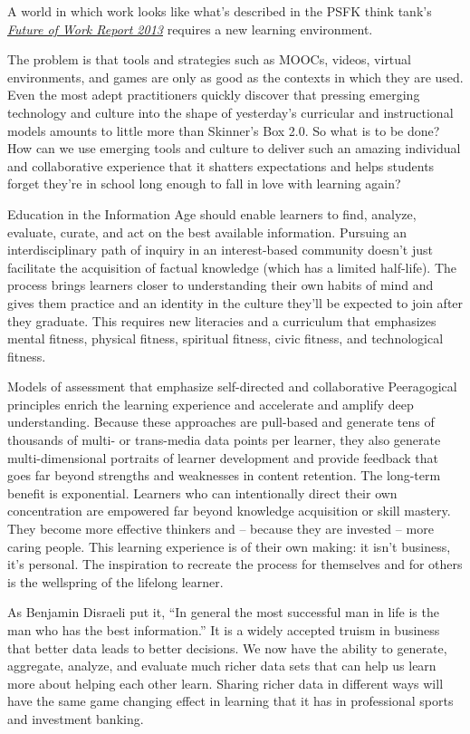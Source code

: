 A world in which work looks like what's described in the PSFK think
tank's
\emph{\href{http://www.slideshare.net/PSFK/psfk-presents-future-of-work-report}{Future
of Work Report 2013}} requires a new learning environment.

The problem is that tools and strategies such as MOOCs, videos, virtual
environments, and games are only as good as the contexts in which they
are used. Even the most adept practitioners quickly discover that
pressing emerging technology and culture into the shape of yesterday's
curricular and instructional models amounts to little more than
Skinner's Box 2.0. So what is to be done? How can we use emerging tools
and culture to deliver such an amazing individual and collaborative
experience that it shatters expectations and helps students forget
they're in school long enough to fall in love with learning again?

Education in the Information Age should enable learners to find,
analyze, evaluate, curate, and act on the best available information.
Pursuing an interdisciplinary path of inquiry in an interest-based
community doesn't just facilitate the acquisition of factual knowledge
(which has a limited half-life). The process brings learners closer to
understanding their own habits of mind and gives them practice and an
identity in the culture they'll be expected to join after they graduate.
This requires new literacies and a curriculum that emphasizes mental
fitness, physical fitness, spiritual fitness, civic fitness, and
technological fitness.

Models of assessment that emphasize self-directed and collaborative
Peeragogical principles enrich the learning experience and accelerate
and amplify deep understanding. Because these approaches are pull-based
and generate tens of thousands of multi- or trans-media data points per
learner, they also generate multi-dimensional portraits of learner
development and provide feedback that goes far beyond strengths and
weaknesses in content retention. The long-term benefit is exponential.
Learners who can intentionally direct their own concentration are
empowered far beyond knowledge acquisition or skill mastery. They become
more effective thinkers and -- because they are invested -- more caring
people. This learning experience is of their own making: it isn't
business, it's personal. The inspiration to recreate the process for
themselves and for others is the wellspring of the lifelong learner.

As Benjamin Disraeli put it, ``In general the most successful man in
life is the man who has the best information.'' It is a widely accepted
truism in business that better data leads to better decisions. We now
have the ability to generate, aggregate, analyze, and evaluate much
richer data sets that can help us learn more about helping each other
learn. Sharing richer data in different ways will have the same game
changing effect in learning that it has in professional sports and
investment banking.

